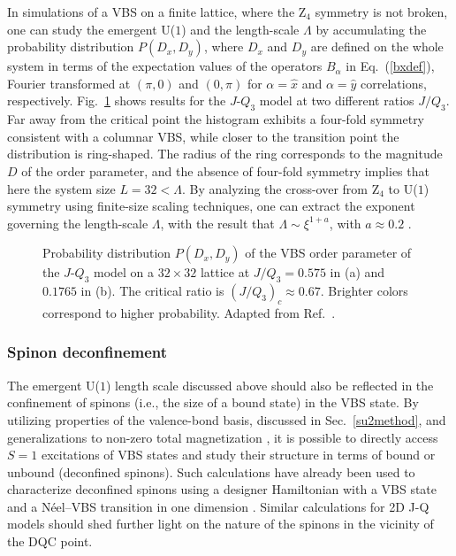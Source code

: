 \documentclass[range]{ar2e}
\begin{document}
In simulations of a VBS on a finite lattice, where the Z$_4$ symmetry is not broken, one can study the emergent U($1$) and the length-scale $\Lambda$ by 
accumulating the probability distribution $P(D_x,D_y)$, where $D_x$ and $D_y$ are defined on the whole system in terms of the expectation values of the 
operators $B_\alpha$ in Eq.~(\ref{bxdef}), Fourier transformed at $(\pi,0)$ and $(0,\pi)$ for $\alpha=\hat x$ and $\alpha=\hat y$ correlations, respectively.
Fig.~\ref{jq3histo} shows results for the $J$-$Q_3$ model at two different ratios $J/Q_3$. Far away from the critical point the histogram exhibits a four-fold
symmetry consistent with a columnar VBS, while closer to the transition point the distribution is ring-shaped. The radius of the ring corresponds
to the magnitude $D$ of the order parameter, and the absence of four-fold symmetry implies that here the system size $L=32 < \Lambda$. By analyzing the
cross-over from Z$_4$ to U($1$) symmetry using finite-size scaling techniques, one can extract the exponent governing the length-scale $\Lambda$, with 
the result that $\Lambda \sim \xi^{1+a}$, with $a \approx 0.2$ \cite{lou2009:sun}.


\begin{figure}
\centerline{}
  \caption{Probability distribution $P(D_x,D_y)$ of the VBS order parameter of the $J$-$Q_3$ model on a $32\times 32$
           lattice at $J/Q_3 = 0.575$ in (a) and $0.1765$ in (b). The critical ratio is $(J/Q_3)_c \approx 0.67$. Brighter colors
           correspond to higher probability. Adapted from Ref.~\cite{lou2009:sun}.}  
\label{jq3histo}
\end{figure}

\subsubsection{Spinon deconfinement}

The emergent U($1$) length scale discussed above should also be reflected in the confinement of spinons (i.e., the size of a bound state) in the VBS state. By utilizing 
properties of the valence-bond basis, discussed in Sec.~\ref{su2method}, and generalizations to non-zero total magnetization \cite{Banerjee10b,Wang10}, it is 
possible to directly access $S=1$ excitations of VBS states and study their structure in terms of bound or unbound (deconfined spinons). Such calculations have 
already been used to characterize deconfined spinons using a designer Hamiltonian with a VBS state and a N\'eel--VBS transition in one dimension \cite{Tang11a}. 
Similar calculations for 2D J-Q models should shed further light on the nature of the spinons in the vicinity of the DQC point.
\end{document}
